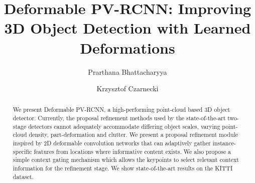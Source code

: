 \documentclass[runningheads]{llncs}
\begin{document}
\pagestyle{headings}
\mainmatter
\def\ECCVSubNumber{21}  

\title{Deformable PV-RCNN: Improving 3D Object Detection with Learned Deformations} 

\institute{Paper ID \ECCVSubNumber}

\author{Prarthana Bhattacharyya \and
Krzysztof Czarnecki}
\maketitle

\begin{abstract}
We present Deformable PV-RCNN, a high-performing point-cloud based 3D object detector. Currently, the proposal refinement methods used by the state-of-the-art two-stage detectors cannot adequately accommodate differing object scales, varying point-cloud density, part-deformation and clutter. We present a proposal refinement module inspired by 2D deformable convolution networks that can adaptively gather instance-specific features from locations where informative content exists. We also propose a simple context gating mechanism which allows the keypoints to select relevant context information for the refinement stage. We show state-of-the-art results on the KITTI dataset.
\end{abstract}
\end{document}
